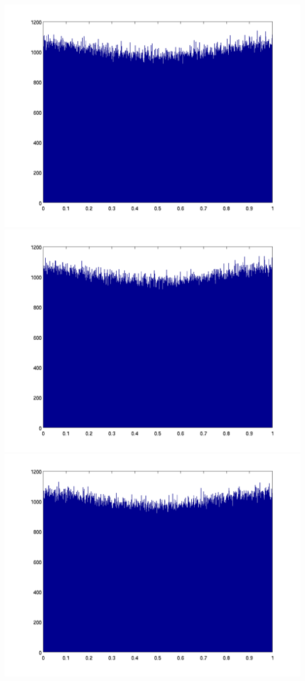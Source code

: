 \documentclass{unswmaths}
\begin{document}
\includegraphics[scale=0.3]{qn_2_a_hist_4}
\includegraphics[scale=0.3]{qn_2_a_hist_5}
\includegraphics[scale=0.3]{qn_2_a_hist_6}
\end{document}
